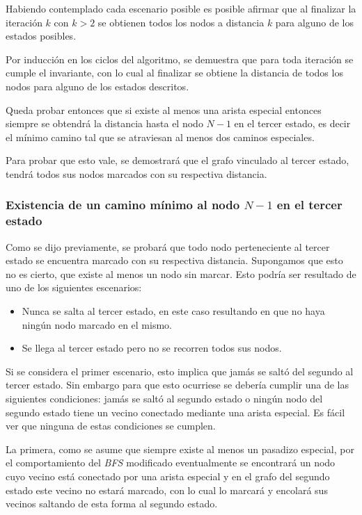 	Habiendo contemplado cada escenario posible es posible afirmar que al
	finalizar la iteración $k$ con $k > 2$ se obtienen todos los nodos a
	distancia $k$ para alguno de los estados posibles.

	Por inducción en los ciclos del algoritmo, se demuestra que para
	toda iteración se cumple el invariante, con lo cual al finalizar se obtiene
	la distancia de todos los nodos para alguno de los estados descritos.

	Queda probar entonces que si existe al menos una arista especial entonces
	siempre se obtendrá la distancia hasta el nodo $N - 1$ en el tercer estado,
	es decir el mínimo camino tal que se atraviesan al menos dos caminos
	especiales.

	Para probar que esto vale, se demostrará que el grafo vinculado al tercer
	estado, tendrá todos sus nodos marcados con su respectiva distancia.

	\subsubsection*{Existencia de un camino mínimo al nodo $N - 1$ en el tercer
	estado}

	Como se dijo previamente, se probará que todo nodo perteneciente al tercer
	estado se encuentra marcado con su respectiva distancia. Supongamos que esto
	no es cierto, que existe al menos un nodo sin marcar. Esto podría ser
	resultado de uno de los siguientes escenarios:

	\begin{itemize}
		\item{Nunca se salta al tercer estado, en este caso resultando en que no
			haya ningún nodo marcado en el mismo.}
		\item{Se llega al tercer estado pero no se recorren todos sus nodos.}
	\end{itemize}

	Si se considera el primer escenario, esto implica que jamás se saltó del
	segundo al tercer estado. Sin embargo para que esto ocurriese se debería
	cumplir una de las siguientes condiciones: jamás se saltó al segundo estado
	o ningún nodo del segundo estado tiene un vecino conectado mediante una
	arista especial. Es fácil ver que ninguna de estas condiciones se cumplen.

	La primera, como se asume que siempre existe al menos un pasadizo especial,
	por el comportamiento del \emph{BFS} modificado eventualmente se
	encontrará un nodo cuyo vecino está conectado por una arista especial y en el
	grafo del segundo estado este vecino no estará marcado, con lo cual lo
	marcará y encolará sus vecinos saltando de esta forma al segundo estado.

